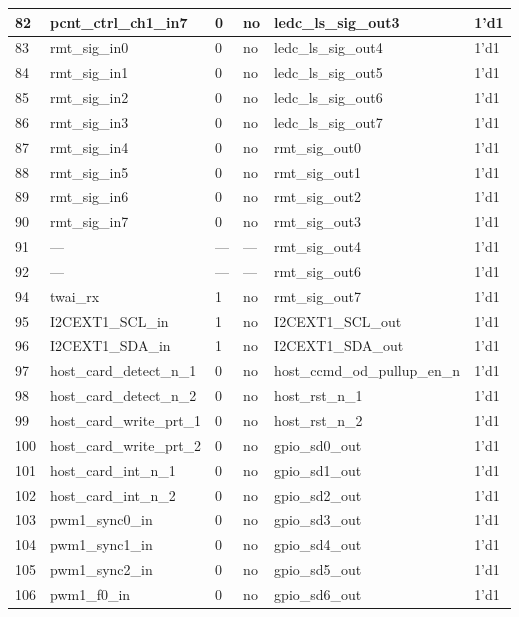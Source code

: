 \begin{longtable}[c]{|p{1cm}|p{3.8cm}|p{2.0cm}|p{2.9cm}|p{4.8cm}|p{3.0cm}| }
    82 & pcnt\_ctrl\_ch1\_in7 & 0 & no & ledc\_ls\_sig\_out3 & 1'd1 \\ \hline
    83 & rmt\_sig\_in0 & 0 & no & ledc\_ls\_sig\_out4 & 1'd1 \\ \hline
    84 & rmt\_sig\_in1 & 0 & no & ledc\_ls\_sig\_out5 & 1'd1 \\ \hline
    85 & rmt\_sig\_in2 & 0 & no & ledc\_ls\_sig\_out6 & 1'd1 \\ \hline
    86 & rmt\_sig\_in3 & 0 & no & ledc\_ls\_sig\_out7 & 1'd1 \\ \hline
    87 & rmt\_sig\_in4 & 0 & no & rmt\_sig\_out0 & 1'd1 \\ \hline
    88 & rmt\_sig\_in5 & 0 & no & rmt\_sig\_out1 & 1'd1 \\ \hline
    89 & rmt\_sig\_in6 & 0 & no & rmt\_sig\_out2 & 1'd1 \\ \hline
    90 & rmt\_sig\_in7 & 0 & no & rmt\_sig\_out3 & 1'd1 \\ \hline
    91 & --- & --- & ---  & rmt\_sig\_out4 & 1'd1 \\ \hline
    92 & --- & --- & --- & rmt\_sig\_out6 & 1'd1 \\ \hline
    94 & twai\_rx & 1 & no & rmt\_sig\_out7 & 1'd1 \\ \hline
    95 & I2CEXT1\_SCL\_in & 1 & no & I2CEXT1\_SCL\_out & 1'd1 \\ \hline
    96 & I2CEXT1\_SDA\_in & 1 & no & I2CEXT1\_SDA\_out & 1'd1 \\ \hline
    97 & host\_card\_detect\_n\_1 & 0 & no & host\_ccmd\_od\_pullup\_en\_n & 1'd1 \\ \hline
    98 & host\_card\_detect\_n\_2 & 0 & no & host\_rst\_n\_1 & 1'd1 \\ \hline
    99 & host\_card\_write\_prt\_1 & 0 & no & host\_rst\_n\_2 & 1'd1 \\ \hline
    100 & host\_card\_write\_prt\_2 & 0 & no & gpio\_sd0\_out & 1'd1 \\ \hline
    101 & host\_card\_int\_n\_1 & 0 & no & gpio\_sd1\_out & 1'd1 \\ \hline
    102 & host\_card\_int\_n\_2 & 0 & no & gpio\_sd2\_out & 1'd1 \\ \hline
    103 & pwm1\_sync0\_in & 0 & no & gpio\_sd3\_out & 1'd1 \\ \hline
    104 & pwm1\_sync1\_in & 0 & no & gpio\_sd4\_out & 1'd1 \\ \hline
    105 & pwm1\_sync2\_in & 0 & no & gpio\_sd5\_out & 1'd1 \\ \hline
    106 & pwm1\_f0\_in & 0 & no & gpio\_sd6\_out & 1'd1 \\ \hline

\end{longtable}
